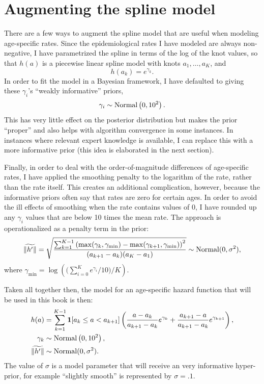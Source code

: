 \section{Augmenting the spline model}
There are a few ways to augment the spline model that are useful when
modeling age-specific rates. Since the epidemiological rates I have modeled
are always non-negative, I have parametrized the spline in
terms of the log of the knot values, so that $h(a)$ is a piecewise
linear spline model with knots $a_1,\ldots,a_K$, and
\[
h(a_k) = e^{\gamma_k}.
\]
In order to fit the model in a Bayesian framework, I have defaulted to
giving these $\gamma_i$'s ``weakly informative'' priors,
\[
\gamma_i \sim \operatorname{Normal}\left(0, 10^2\right).
\]
This has very little effect on the posterior distribution but makes
the prior ``proper'' and also helps with algorithm convergence in
some instances. In instances where relevant expert knowledge is
available, I can replace this with a more informative prior (this idea
is elaborated in the next section).

Finally, in order to deal with the order-of-magnitude differences of
age-specific rates, I have applied the smoothing penalty to the
logarithm of the rate, rather than the rate itself.  This creates an additional
complication, however, because the informative priors often say that
rates are zero for certain ages.  In order to avoid the ill effects of
smoothing when the rate contains values of $0$, I have
rounded up any $\gamma_i$ values that are below 10 times the mean
rate.  The approach is operationalized as a penalty term in the prior:
\[
\widetilde{\|h'\|} = \sqrt{\frac{\sum_{k=1}^{K-1}
\left(\max(\gamma_k, \gamma_{\min})
-
\max(\gamma_{k+1}, \gamma_{\min})\right)^2
}{(a_{k+1}-a_k)(a_K-a_1)}} \sim \operatorname{Normal}(0, \sigma^2),
\]
where $\gamma_{\min} = \log\left(\bigg(\sum_{i=0}^K e^{\gamma_i}/10\bigg)
/ K\right)$.


Taken all together then, the model for an age-specific hazard function
that will be used in this book is then:
\begin{align*}
h(a) &= \sum_{k=1}^{K-1} \mathbf{1}[a_k \leq a < a_{k+1}]
\left( \frac{a-a_k}    {a_{k+1}-a_k} e^{\gamma_k}
     + \frac{a_{k+1}-a}{a_{k+1}-a_k} e^{\gamma_{k+1}}\right),\\
\gamma_k &\sim \operatorname{Normal}\left(0, 10^2\right),\\
\widetilde{\|h'\|} &\sim \operatorname{Normal}(0, \sigma^2).\\
\end{align*}
The value of $\sigma$ is a model parameter that will receive an very
informative hyper-prior, for example ``slightly smooth'' is
represented by $\sigma=.1$.




